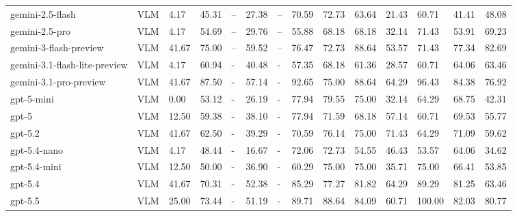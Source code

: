 \begin{table}[htbp!]
\begin{adjustbox}{max width=\textwidth}
\begin{tabular}{llllllllllllll}
gemini-2.5-flash & VLM & 4.17 & 45.31 & -- & 27.38 & -- & 70.59 & 72.73 & 63.64 & 21.43 & 60.71 & 41.41 & 48.08\\
gemini-2.5-pro & VLM & 4.17 & 54.69 & -- & 29.76 & -- & 55.88 & 68.18 & 68.18 & 32.14 & 71.43 & 53.91 & 69.23\\
gemini-3-flash-preview & VLM & 41.67 & 75.00 & -- & 59.52 & -- & 76.47 & 72.73 & 88.64 & 53.57 & 71.43 & 77.34 & 82.69  \\
gemini-3.1-flash-lite-preview & VLM & 4.17 & 60.94 & - & 40.48 & - & 57.35 & 68.18 & 61.36 & 28.57 & 60.71 & 64.06 & 63.46   \\
gemini-3.1-pro-preview & VLM & 41.67 & 87.50 & - & 57.14 & - & 92.65 & 75.00 & 88.64 & 64.29 & 96.43 & 84.38 & 76.92   \\
gpt-5-mini & VLM & 0.00 & 53.12 & - & 26.19 & - & 77.94 & 79.55 & 75.00 & 32.14 & 64.29 & 68.75 & 42.31   \\
gpt-5 & VLM & 12.50 & 59.38 & - & 38.10 & - & 77.94 & 71.59 & 68.18 & 57.14 & 60.71 & 69.53 & 55.77   \\
gpt-5.2 & VLM & 41.67 & 62.50 & - & 39.29 & - & 70.59 & 76.14 & 75.00 & 71.43 & 64.29 & 71.09 & 59.62 \\
gpt-5.4-nano & VLM & 4.17 & 48.44 & - & 16.67 & - & 72.06 & 72.73 & 54.55 & 46.43 & 53.57 & 64.06 & 34.62  \\
gpt-5.4-mini & VLM & 12.50 & 50.00 & - & 36.90 & - & 60.29 & 75.00 & 75.00 & 35.71 & 75.00 & 66.41 & 53.85 \\
gpt-5.4 & VLM & 41.67 & 70.31 & - & 52.38 & - & 85.29 & 77.27 & 81.82 & 64.29 & 89.29 & 81.25 & 63.46   \\
gpt-5.5 & VLM & 25.00 & 73.44 & - & 51.19 & - & 89.71 & 88.64 & 84.09 & 60.71 & 100.00 & 82.03 & 80.77 \\
\bottomrule

\end{tabular} 
\end{adjustbox}
\end{table}
